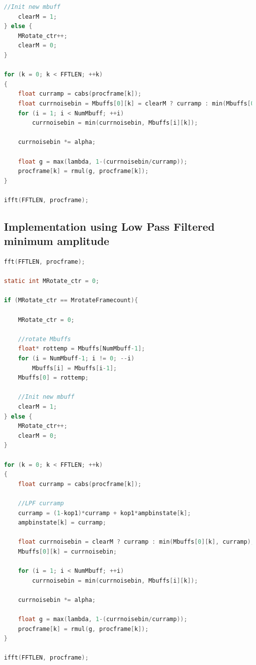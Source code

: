 \documentclass[11pt]{article} %
\begin{document}
{\begin{center}
\begin{lstlisting}[language = C]
	//Init new mbuff
	clearM = 1;
} else {
	MRotate_ctr++;
	clearM = 0;
}

for (k = 0; k < FFTLEN; ++k)
{
	float curramp = cabs(procframe[k]); 
	float currnoisebin = Mbuffs[0][k] = clearM ? curramp : min(Mbuffs[0][k], curramp);
	for (i = 1; i < NumMbuff; ++i)
		currnoisebin = min(currnoisebin, Mbuffs[i][k]);

	currnoisebin *= alpha;

	float g = max(lambda, 1-(currnoisebin/curramp));
	procframe[k] = rmul(g, procframe[k]);
}

ifft(FFTLEN, procframe);

    \end{lstlisting}
  \end{center}

\clearpage

 \subsection{Implementation using Low Pass Filtered minimum amplitude} %
 \label{sub:implementation_using_low_pass_filtered_minimum_amplitude}
 \begin{center}
 	\begin{lstlisting}[language = C]
fft(FFTLEN, procframe);
									
static int MRotate_ctr = 0;

if (MRotate_ctr == MrotateFramecount){

	MRotate_ctr = 0;

	//rotate Mbuffs
	float* rottemp = Mbuffs[NumMbuff-1];
	for (i = NumMbuff-1; i != 0; --i)
		Mbuffs[i] = Mbuffs[i-1];
	Mbuffs[0] = rottemp;

	//Init new mbuff
	clearM = 1;
} else {
	MRotate_ctr++;
	clearM = 0;
}

for (k = 0; k < FFTLEN; ++k)
{
	float curramp = cabs(procframe[k]); 

	//LPF curramp
	curramp = (1-kop1)*curramp + kop1*ampbinstate[k];
	ampbinstate[k] = curramp;

	float currnoisebin = clearM ? curramp : min(Mbuffs[0][k], curramp);
	Mbuffs[0][k] = currnoisebin;

	for (i = 1; i < NumMbuff; ++i)
		currnoisebin = min(currnoisebin, Mbuffs[i][k]);

	currnoisebin *= alpha;

	float g = max(lambda, 1-(currnoisebin/curramp));
	procframe[k] = rmul(g, procframe[k]);
}

ifft(FFTLEN, procframe);
 	\end{lstlisting}
 \end{center}

}
\end{document}
